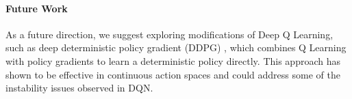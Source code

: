 \documentclass{article}
\begin{document}
\paragraph{Future Work} As a future direction, we suggest exploring modifications of Deep Q Learning,
such as deep deterministic policy gradient (DDPG) \cite{ddpg}, which combines Q
Learning with policy gradients to learn a deterministic policy directly. This
approach has shown to be effective in continuous action spaces and could
address some of the instability issues observed in DQN.

\newpage
\nocite{*}


\end{document}
